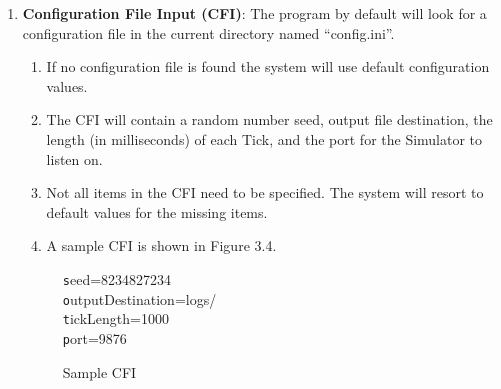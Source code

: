 \begin{enumerate}

  
  \item \textbf{Configuration File Input (CFI)}: The program by default will look for a configuration file in the current directory named ``config.ini''.
  \begin{enumerate}
    \item If no configuration file is found the system will use default configuration values.
    \item The CFI will contain a random number seed, output file destination, the length (in milliseconds) of each Tick, and the port for the Simulator to listen on.
    \item Not all items in the CFI need to be specified. The system will resort to default values for the missing items.
    \item A sample CFI is shown in Figure 3.4.
  \end{enumerate}

\begin{figure}[H]
\centering
\texttt seed=8234827234\\
\texttt outputDestination=logs/\\
\texttt tickLength=1000\\
\texttt port=9876\\
\caption{Sample CFI}
\label{fig:CFI}
\end{figure}

  

\end{enumerate}

